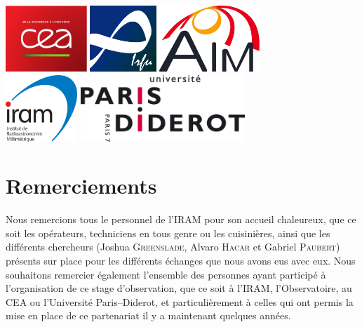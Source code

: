 \documentclass[a4paper,10pt,french]{article}
\begin{document}
\begin{center}
    \vspace{0.5cm}

    \hfill \includegraphics[height=2.5cm]{logo_cea.pdf} \hfill \includegraphics[height=2.5cm]{logo_irfu.png} \hfill \includegraphics[height=2.5cm]{logo_aim.jpg} \hfill \null \\
    \vspace{0.5cm}
    \hfill \includegraphics[height=2.5cm]{logo_iram.png} \hfill \includegraphics[height=2.5cm]{logo_upd.png} \hfill \null \\

\end{center}

\vfill
\hfill \thedate

\newpage

\thispagestyle{empty}

\section*{Remerciements}

Nous remercions tous le personnel de l’IRAM pour son accueil chaleureux, que ce
soit les opérateurs, techniciens en tous genre ou les cuisinières, ainsi que
les différents chercheurs (Joshua \textsc{Greenslade}, Alvaro \textsc{Hacar} et
Gabriel \textsc{Paubert}) présents sur place pour les différents échanges que
nous avons eus avec eux. Nous souhaitons remercier également l’ensemble des
personnes ayant participé à l’organisation de ce stage d’observation, que ce
soit à l’IRAM, l’Observatoire, au CEA ou l’Université Paris–Diderot, et
particulièrement à celles qui ont permis la mise en place de ce partenariat il
y a maintenant quelques années.
\end{document}

